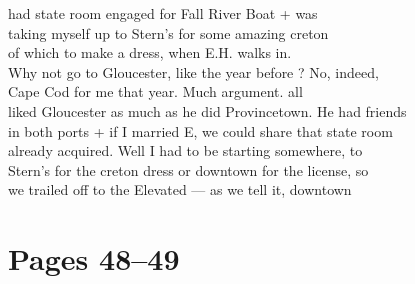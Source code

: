 \documentclass[11pt,a4paper]{article}
\begin{document}
{had state room engaged for Fall River Boat + was \\
taking myself up to Stern's for some amazing creton \\
 of which to make a dress, when E.H. walks in. \\
Why not go to Gloucester, like the year before ? No, indeed, \\
Cape Cod for me that year. Much argument.  all  \\
liked Gloucester as much as he did Provincetown. He had friends \\
in both ports + if I married E, we could share that state room \\
already acquired. Well I had to be starting somewhere,  to \\
Stern's for the creton dress  or downtown for the license, so \\
we trailed off to the Elevated --- as we tell it,  downtown}








\section{Pages 48--49}
\end{document}
